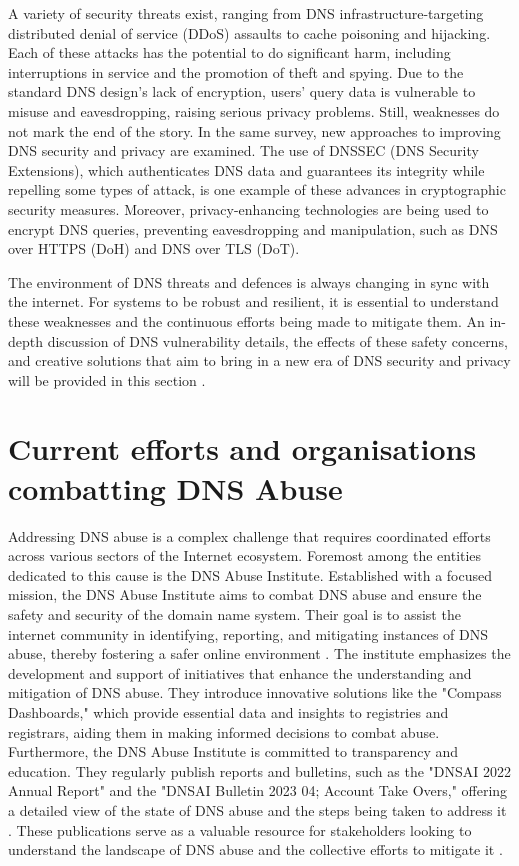 A variety of security threats exist, ranging from DNS infrastructure-targeting distributed denial of service (DDoS) assaults to cache poisoning and hijacking. Each of these attacks has the potential to do significant harm, including interruptions in service and the promotion of theft and spying. Due to the standard DNS design's lack of encryption, users' query data is vulnerable to misuse and eavesdropping, raising serious privacy problems. Still, weaknesses do not mark the end of the story. In the same survey, new approaches to improving DNS security and privacy are examined. The use of DNSSEC (DNS Security Extensions), which authenticates DNS data and guarantees its integrity while repelling some types of attack, is one example of these advances in cryptographic security measures. Moreover, privacy-enhancing technologies are being used to encrypt DNS queries, preventing eavesdropping and manipulation, such as DNS over HTTPS (DoH) and DNS over TLS (DoT).

The environment of DNS threats and defences is always changing in sync with the internet. For systems to be robust and resilient, it is essential to understand these weaknesses and the continuous efforts being made to mitigate them. An in-depth discussion of DNS vulnerability details, the effects of these safety concerns, and creative solutions that aim to bring in a new era of DNS security and privacy will be provided in this section \cite{sciencedirect2023dns}.

\section{Current efforts and organisations combatting DNS Abuse}

Addressing DNS abuse is a complex challenge that requires coordinated efforts across various sectors of the Internet ecosystem. Foremost among the entities dedicated to this cause is the DNS Abuse Institute. Established with a focused mission, the DNS Abuse Institute aims to combat DNS abuse and ensure the safety and security of the domain name system. Their goal is to assist the internet community in identifying, reporting, and mitigating instances of DNS abuse, thereby fostering a safer online environment \cite{dnsabuseinstitute2023}. The institute emphasizes the development and support of initiatives that enhance the understanding and mitigation of DNS abuse. They introduce innovative solutions like the "Compass Dashboards," which provide essential data and insights to registries and registrars, aiding them in making informed decisions to combat abuse. Furthermore, the DNS Abuse Institute is committed to transparency and education. They regularly publish reports and bulletins, such as the "DNSAI 2022 Annual Report" and the "DNSAI Bulletin 2023 04; Account Take Overs," offering a detailed view of the state of DNS abuse and the steps being taken to address it \cite{dnsabuseinstitute2023} . These publications serve as a valuable resource for stakeholders looking to understand the landscape of DNS abuse and the collective efforts to mitigate it  \cite{dnsai2022report}.

